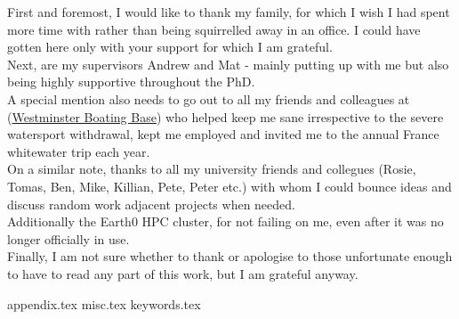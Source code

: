 \documentclass[twoside,openleft,reqno,a4paper,final]{book}
\newcommand{\chapterbib}{
\newpage


}
\begin{document}
\parbox{.75\textwidth}{
 First and foremost, I would like to thank my family, for which I wish I had spent more time with rather than being squirrelled away in an office. I could have gotten here only with your support for which I am grateful.\\

 Next, are my supervisors Andrew and Mat - mainly putting up with me but also being highly supportive throughout the PhD.\\

 A special mention also needs to go out to all my friends and colleagues at (\href{www.westminsterboatingbase.co.uk} {Westminster Boating Base}) who helped keep me sane irrespective to the severe watersport withdrawal, kept me employed and invited me to the annual France whitewater trip each year.\\

 On a similar note, thanks to all my university friends and collegues  (Rosie, Tomas, Ben, Mike, Killian, Pete, Peter etc.) with whom I could bounce ideas and discuss random work adjacent projects when needed.\\

 Additionally the Earth0 HPC cluster, for not failing on me, even after it was no longer officially in use.\\

 Finally, I am not sure whether to thank or apologise to those unfortunate enough to have to read any part of this work, but I am grateful anyway.\\

}



\tableofcontents
\listoffigures
\listoftables
\newpage
\mainmatter





 
%

%


%
 

 
%
%
 
%

\cleardoublepage\makeatletter\@openrightfalse\makeatother
\begin{appendices}
{appendix.tex}
{misc.tex}
{keywords.tex}

\end{appendices}




\newpage
%
%
%
\end{document}
